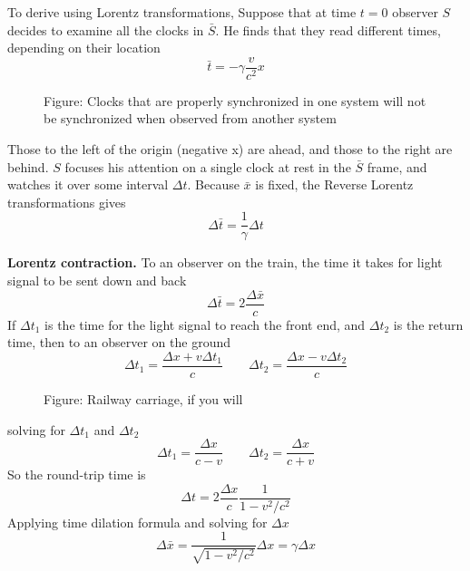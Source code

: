 \documentclass[../../../main.tex]{subfiles}
\begin{document}
To derive using Lorentz transformations, Suppose that at time $t = 0$ observer $S$ decides to examine all the clocks in $\bar{S}$. He finds that they read different times, depending on their location
\begin{equation*}
    \bar{t}=-\gamma\frac{v}{c^2}x
\end{equation*}
\begin{figure}
    \centering
    \caption*{Figure: Clocks that are properly synchronized in one system will not be synchronized when observed from another system}
\end{figure}
Those to the left of the origin (negative x) are ahead, and those to the right are behind. $S$ focuses his attention on a single clock at rest in the $\bar{S}$ frame, and watches it over some interval $\Delta t$. Because $\bar{x}$ is fixed, the Reverse Lorentz transformations gives
\begin{equation*}
    \Delta \bar{t}=\frac{1}{\gamma}\Delta t
\end{equation*}

\textbf{Lorentz contraction.} To an observer on the train, the time it takes for light signal to be sent down and back 
\begin{equation*}
    \Delta \bar{t}=2\frac{\Delta \bar{x}}{c}
\end{equation*}
If $\Delta t_1$ is the time for the light signal to reach the front end, and $\Delta t_2$ is the return time, then to an observer on the ground
\begin{equation*}
    \Delta t_1=\frac{\Delta x+v\Delta t_1}{c}\qquad \Delta t_2=\frac{\Delta x-v\Delta t_2}{c}
\end{equation*}
\begin{figure}[b]
    \centering
    \caption*{Figure: Railway carriage, if you will}
\end{figure}
solving for $\Delta t_1$ and $\Delta t_2$
\begin{equation*}
    \Delta t_1=\frac{\Delta x}{c-v}\qquad \Delta t_2=\frac{\Delta x}{c+v}
\end{equation*}
So the round-trip time is
\begin{equation*}
    \Delta t=2\frac{\Delta x}{c}\frac{1}{1-v^2/c^2}
\end{equation*}
Applying time dilation formula and solving for $\Delta x$
\begin{equation*}
    \Delta \bar{x}=\frac{1}{\sqrt{1-v^2/c^2}}\Delta x=\gamma \Delta x
\end{equation*}
\end{document}
